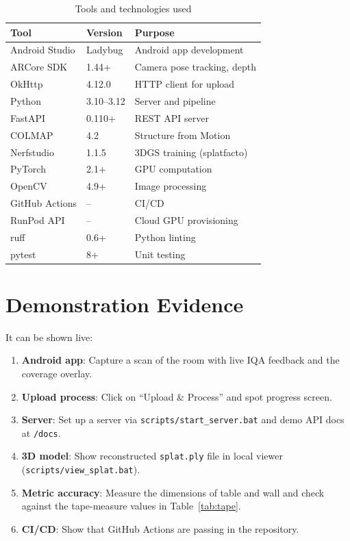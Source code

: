 \begin{table}[htbp]
\centering
\small
\caption{Tools and technologies used}
\label{tab:tools}
\begin{tabular}{p{3.5cm}p{3cm}p{4.5cm}}
\toprule
\textbf{Tool} & \textbf{Version} & \textbf{Purpose} \\
\midrule
Android Studio & Ladybug & Android app development \\
ARCore SDK & 1.44+ & Camera pose tracking, depth \\
OkHttp & 4.12.0 & HTTP client for upload \\
Python & 3.10--3.12 & Server and pipeline \\
FastAPI & 0.110+ & REST API server \\
COLMAP & 4.2 & Structure from Motion \\
Nerfstudio & 1.1.5 & 3DGS training (splatfacto) \\
PyTorch & 2.1+ & GPU computation \\
OpenCV & 4.9+ & Image processing \\
GitHub Actions & -- & CI/CD \\
RunPod API & -- & Cloud GPU provisioning \\
ruff & 0.6+ & Python linting \\
pytest & 8+ & Unit testing \\
\bottomrule
\end{tabular}
\end{table}

\section{Demonstration Evidence}
It can be shown live:
\begin{enumerate}
    \item \textbf{Android app}: Capture a scan of the room with live IQA feedback and the coverage overlay.
    \item \textbf{Upload process}: Click on ``Upload \& Process'' and spot progress screen.
    \item \textbf{Server}: Set up a server via \texttt{scripts/start\_server.bat} and demo API docs at \texttt{/docs}.
    \item \textbf{3D model}: Show reconstructed \texttt{splat.ply} file in local viewer (\texttt{scripts/view\_splat.bat}).
    \item \textbf{Metric accuracy}: Measure the dimensions of table and wall and check against the tape-measure values in Table~\ref{tab:tape}.
    \item \textbf{CI/CD}: Show that GitHub Actions are passing in the repository.
\end{enumerate}

